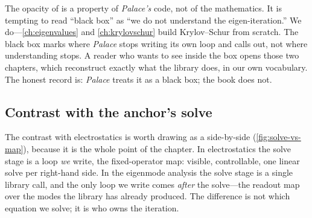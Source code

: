 \begin{pitfall}
The opacity of  is a property of \emph{Palace's} code, not of the
mathematics. It is tempting to read ``black box'' as ``we do not understand the
eigen-iteration.'' We do---\cref{ch:eigenvalues} and \cref{ch:krylovschur} build
Krylov--Schur from scratch. The black box marks where \emph{Palace} stops writing
its own loop and calls out, not where understanding stops. A reader who wants to
see inside the box opens those two chapters, which reconstruct exactly what the
library does, in our own vocabulary. The honest record is: \emph{Palace} treats
it as a black box; the book does not.
\end{pitfall}

\subsection{Contrast with the anchor's solve}

The contrast with electrostatics is worth drawing as a side-by-side
(\cref{fig:solve-vs-map}), because it is the whole point of the chapter. In
electrostatics the solve stage is a loop \emph{we} write, the
 fixed-operator map: visible, controllable, one linear solve
per right-hand side. In the eigenmode analysis the solve stage is a single
library call, and the only loop we write comes \emph{after} the solve---the
readout map over the modes the library has already produced. The difference is
not which equation we solve; it is who owns the iteration.

